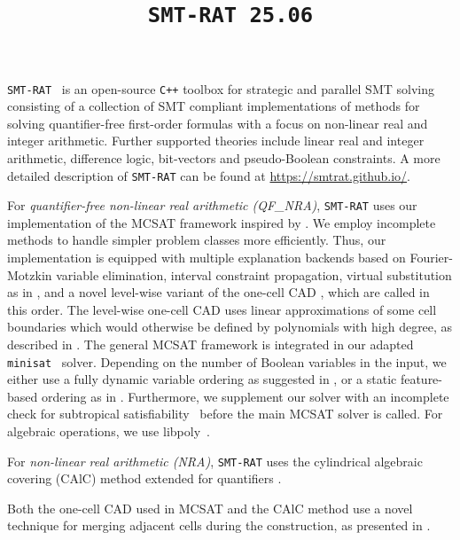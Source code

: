 \documentclass{article}
\title{\texttt{SMT-RAT 25.06}}
\begin{document}
\maketitle

\texttt{SMT-RAT}~\cite{Corzilius2015} is an open-source \texttt{C++} toolbox for strategic and parallel SMT solving consisting of a collection of SMT compliant implementations of methods for
solving quantifier-free first-order formulas with a focus on non-linear real and integer arithmetic.
Further supported theories include linear real and integer arithmetic, difference logic, bit-vectors and pseudo-Boolean constraints.
A more detailed description of \texttt{SMT-RAT} can be found at \href{https://smtrat.github.io/}{\color{blue}https://smtrat.github.io/}.


For \emph{quantifier-free non-linear real arithmetic (QF\_NRA)}, \texttt{SMT-RAT} uses our implementation of the MCSAT framework \cite{Moura2013} inspired by \cite{jovanovic2012solving}.
We employ incomplete methods to handle simpler problem classes more efficiently.
Thus, our implementation is equipped with multiple explanation backends based on Fourier-Motzkin variable elimination, interval constraint propagation, virtual substitution as in \cite{Abraham2017}, and a novel level-wise variant of the one-cell CAD \cite{brown2015constructing,nalbach2024}, which are called in this order.
The level-wise one-cell CAD uses linear approximations of some cell boundaries which would otherwise be defined by polynomials with high degree, as described in \cite{promies2025}.
The general MCSAT framework is integrated in our adapted \texttt{minisat}~\cite{Een2003} solver.
Depending on the number of Boolean variables in the input, we either use a fully dynamic variable ordering as suggested in \cite{Jovanovic2013, nalbach2019}, or a static feature-based ordering as in \cite{pickering2024}.
Furthermore, we supplement our solver with an incomplete check for subtropical satisfiability~\cite{Fontaine2017} before the main MCSAT solver is called.
For algebraic operations, we use libpoly~\cite{libpoly}.

For \emph{non-linear real arithmetic (NRA)}, \texttt{SMT-RAT} uses the cylindrical algebraic covering (CAlC) method \cite{Abraham2020} extended for quantifiers \cite{kremer2023, nalbach2024calc}.

Both the one-cell CAD used in MCSAT and the CAlC method use a novel technique for merging adjacent cells during the construction, as presented in \cite{nalbach2024mergingcells}.
\end{document}
